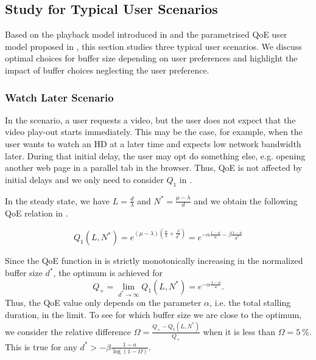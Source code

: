 \subsection{ Study for Typical User Scenarios}\label{sec:application:qoe_user_behaviour:typical_user_scenarios}
Based on the playback model introduced in  and the parametrised \gls{QoE} user model proposed in , this section studies three typical user scenarios.
We discuss optimal choices for buffer size depending on user preferences and highlight the impact of buffer choices neglecting the user preference.

\subsubsection*{Watch Later Scenario}\label{sec:application:qoe_user_behaviour:typical_user_scenarios:watch_later}
In the \watchLater scenario, a user requests a video, but the user does not expect that the video play-out starts immediately. 
This may be the case, for example, when the user wants to watch an HD at a later time and expects low network bandwidth later. 
During that initial delay, the user may opt do something else, e.g. opening another web page in a parallel tab in the browser.
Thus, \gls{QoE} is not affected by initial delays and we only need to consider \(Q_1\) in .

In the steady state, we have \(L=\frac{d}{\lambda}\) and \(N^*=\frac{\mu-\lambda}{d}\) and we obtain the following QoE relation in . 

\begin{equation}
   Q_1(L,N^*) = e^{\left(\mu-\lambda\right)(\frac{\alpha}{\lambda} +\frac{\beta}{d^*})}
	 = e^{-\alpha \frac{1-a}{a} - \beta \frac{1-a}{d^*}}
\label{eq:application:qoe_user_behaviour:typical_user_scenarios:stalling_steady_state}
\end{equation}

Since the \gls{QoE} function in  is strictly monotonically increasing in the normalized buffer size \(d^*\), the optimum is achieved for 
\[Q_+=\lim\limits_{d^* \to \infty} Q_1(L,N^*)=e^{-\alpha \frac{1-a}{a}}.\]
Thus, the QoE value only depends on the parameter \(\alpha\), i.e. the total stalling duration, in the limit.
To see for which buffer size we are close to the optimum, we consider the relative difference \(\Omega = \frac{Q_+-Q_1(L,N^*)}{Q_+}\) when it is less than \(\Omega=\SI{5}{\percent}\).
This is true for any \(d^*> -\beta \frac{1-a}{\log\left(1-\Omega\right)}\). 

